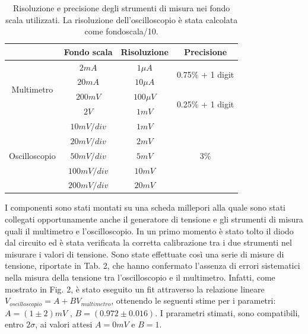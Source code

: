 \documentclass[a4paper,11pt]{article}
\begin{document}
\begin{table}[h!]
  \begin{center}
    \begin{tabular}{|c|c|c|c|}
      \hline
                                     & Fondo scala  & Risoluzione & Precisione                        \\
      \hline
      \multirow{4}{*}{Multimetro}    & $2 mA$       & $1\mu A$    & \multirow{2}{*}{0.75\% + 1 digit} \\
                                     & $20 mA$      & $10\mu A$   &                                   \\
      \cline{2-4}
                                     & $200 mV$     & $100 \mu V$ & \multirow{2}{*}{0.25\% + 1 digit} \\
                                     & $2 V$        & $1 mV$      &                                   \\
      \hline
      \multirow{5}{*}{Oscilloscopio} & $10 mV/div$  & $1 mV$      & \multirow{5}{*}{3\%}              \\
                                     & $20 mV/div$  & $2 mV$      &                                   \\
                                     & $50 mV/div$  & $5 mV$      &                                   \\
                                     & $100 mV/div$ & $10 mV$     &                                   \\
                                     & $200 mV/div$ & $20 mV$     &                                   \\
      \hline
    \end{tabular}
    \caption{Risoluzione e precisione degli strumenti di misura nei fondo scala utilizzati. La risoluzione dell'oscilloscopio è stata calcolata come fondoscala/10.}
  \end{center}
\end{table}

I componenti sono stati montati su una scheda millepori alla quale sono stati collegati opportunamente anche il generatore di tensione e gli strumenti di misura quali il multimetro e l'oscilloscopio.
In un primo momento è stato tolto il diodo dal circuito ed è stata verificata la corretta calibrazione tra i due strumenti nel misurare i valori di tensione. Sono state effettuate così una serie di misure di tensione, riportate in Tab. 2, che hanno confermato l'assenza di errori sistematici nella misura della tensione tra l'oscilloscopio e il multimetro. Infatti, come mostrato in Fig. 2,  è stato eseguito un fit attraverso la relazione lineare $V_{oscilloscopio} = A + B V_{multimetro}$, ottenendo le seguenti stime per i parametri: $A = (1 \pm 2) mV$ , $B = (0.972 \pm 0.016)$. I prarametri stimati, sono compatibili, entro $2\sigma$, ai valori attesi $A = 0 mV$ e $B=1$.
\end{document}
